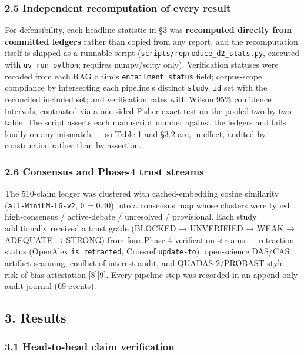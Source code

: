 \documentclass[11pt]{article}
\begin{document}
\subsubsection{2.5 Independent recomputation of every
result}\label{independent-recomputation-of-every-result}

For defensibility, each headline statistic in §3 was \textbf{recomputed
directly from committed ledgers} rather than copied from any report, and
the recomputation itself is shipped as a runnable script
(\texttt{scripts/reproduce\_d2\_stats.py}, executed with
\texttt{uv\ run\ python}; requires numpy/scipy only). Verification
statuses were recoded from each RAG claim's \texttt{entailment\_status}
field; corpus-scope compliance by intersecting each pipeline's distinct
\texttt{study\_id} set with the reconciled included set; and
verification rates with Wilson 95\% confidence intervals, contrasted via
a one-sided Fisher exact test on the pooled two-by-two table. The script
asserts each manuscript number against the ledgers and fails loudly on
any mismatch --- so Table 1 and §3.2 are, in effect, audited by
construction rather than by assertion.

\subsubsection{2.6 Consensus and Phase-4 trust
streams}\label{consensus-and-phase-4-trust-streams}

The 510-claim ledger was clustered with cached-embedding cosine
similarity (\texttt{all-MiniLM-L6-v2}, θ = 0.40) into a consensus map
whose clusters were typed high-consensus / active-debate / unresolved /
provisional. Each study additionally received a trust grade (BLOCKED →
UNVERIFIED → WEAK → ADEQUATE → STRONG) from four Phase-4 verification
streams --- retraction status (OpenAlex \texttt{is\_retracted}, Crossref
\texttt{update-to}), open-science DAS/CAS artifact scanning,
conflict-of-interest audit, and QUADAS-2/PROBAST-style risk-of-bias
attestation {[}8{]}{[}9{]}. Every pipeline step was recorded in an
append-only audit journal (69 events).

\subsection{3. Results}\label{results}

\subsubsection{3.1 Head-to-head claim
verification}\label{head-to-head-claim-verification}
\end{document}
